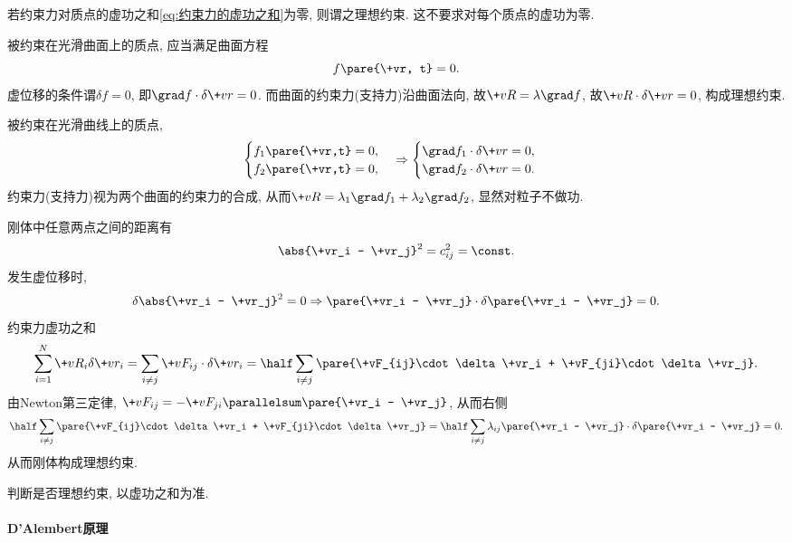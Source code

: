 \documentclass{ctexart}
\begin{document}
若约束力对质点的虚功之和\eqref{eq:约束力的虚功之和}为零, 则谓之理想约束. 这不要求对每个质点的虚功为零.
\begin{sample}
    \begin{ex}
        被约束在光滑曲面上的质点, 应当满足曲面方程
        \[ f\pare{\+vr, t} = 0. \]
        虚位移的条件谓$\delta f = 0$, 即$\grad f \cdot\delta\+vr = 0$. 而曲面的约束力(支持力)沿曲面法向, 故$\+vR = \lambda\grad f$, 故$\+vR\cdot\delta\+vr = 0$, 构成理想约束.
    \end{ex}
    \begin{ex}
        被约束在光滑曲线上的质点,
        \[ \begin{cases}
            f_1\pare{\+vr,t} = 0,\\
            f_2\pare{\+vr,t} = 0,
        \end{cases}\Rightarrow \begin{cases}
            \grad f_1 \cdot \delta \+vr = 0,\\
            \grad f_2 \cdot \delta \+vr = 0.
        \end{cases} \]
        约束力(支持力)视为两个曲面的约束力的合成, 从而$\+vR = \lambda_1 \grad f_1 + \lambda_2 \grad f_2$, 显然对粒子不做功.
    \end{ex}
    \begin{ex}
        刚体中任意两点之间的距离有
        \[ \abs{\+vr_i - \+vr_j}^2 = c_{ij}^2 = \const. \]
        发生虚位移时,
        \[ \delta\abs{\+vr_i - \+vr_j}^2 = 0 \Rightarrow \pare{\+vr_i - \+vr_j} \cdot\delta\pare{\+vr_i - \+vr_j} = 0. \]
        约束力虚功之和
        \[ \sum_{i=1}^N \+vR_i\delta\+vr_i = \sum_{i\neq j} \+vF_{ij}\cdot\delta\+vr_i = \half \sum_{i\neq j} \pare{\+vF_{ij}\cdot\delta\+vr_i + \+vF_{ji}\cdot\delta\+vr_j}. \]
        由Newton第三定律, $\+vF_{ij} = -\+vF_{ji} \parallelsum \pare{\+vr_i - \+vr_j}$, 从而右侧
        \[ \half \sum_{i\neq j} \pare{\+vF_{ij}\cdot\delta\+vr_i + \+vF_{ji}\cdot\delta\+vr_j} = \half \sum_{i\neq j} \lambda_{ij}\pare{\+vr_i - \+vr_j}\cdot\delta\pare{\+vr_i - \+vr_j} = 0. \]
        从而刚体构成理想约束.
    \end{ex}
\end{sample}
\begin{pitfall}
    判断是否理想约束, 以虚功之{\color{red}和}为准.
\end{pitfall}


\paragraph{D'Alembert原理} %
\label{par:d_alembert原理}
\end{document}
